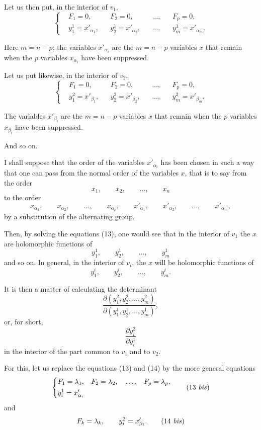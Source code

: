 \documentclass{article}
\begin{document}
Let us then put, in the interior of $v_{1}$,
\[
\left\{
\begin{aligned}
&F_{1} = 0, &&F_{2} = 0, &&\ldots, &&F_{p} = 0,\\
&y^{1}_{1} = x'_{\alpha_{1}}, &&y^{1}_{2} = x'_{\alpha_{2}}, &&\ldots, &&y^{1}_{m} = x'_{\alpha_{m}}.
\end{aligned}
\right.
\tag{13}
\]

Here $m = n - p$; the variables $x'_{\alpha_{i}}$ are the $m = n - p$ variables $x$ that remain when the $p$ variables $x_{\alpha_{i}}$ have been suppressed.

Let us put likewise, in the interior of $v_{2}$,
\[
\left\{
\begin{aligned}
&F_{1} = 0, &&F_{2} = 0, &&\ldots, &&F_{p} = 0,\\
&y^{2}_{1} = x'_{\beta_{1}}, &&y^{2}_{2} = x'_{\beta_{2}}, &&\ldots, &&y^{2}_{m} = x'_{\beta_{m}}.
\end{aligned}
\right.
\tag{14}
\]

The variables $x'_{\beta_{i}}$ are the $m = n - p$ variables $x$ that remain when the $p$ variables $x_{\beta_{i}}$ have been suppressed.

And so on.

I shall suppose that the order of the variables $x'_{\alpha_{i}}$ has been chosen in such a way that one can pass from the normal order of the variables $x$, that is to say from the order
\[
x_{1}, \qquad x_{2}, \qquad \ldots, \qquad x_{n}
\]
to the order
\[
x_{\alpha_{1}}, \qquad x_{\alpha_{2}}, \qquad \ldots, \qquad x_{\alpha_{p}}, \qquad x'_{\alpha_{1}}, \qquad x'_{\alpha_{2}}, \qquad \ldots, \qquad x'_{\alpha_{m}},
\]
by a substitution of the alternating group.

Then, by solving the equations (13), one would see that in the interior of $v_{1}$ the $x$ are holomorphic functions of
\[
y^{1}_{1}, \qquad y^{1}_{2}, \qquad \ldots, \qquad y^{1}_{m}
\]
and so on. In general, in the interior of $v_{i}$, the $x$ will be holomorphic functions of
\[
y^{i}_{1}, \qquad y^{i}_{2}, \qquad \ldots, \qquad y^{i}_{m}.
\]

It is then a matter of calculating the determinant
\[
\frac{\partial(y^{2}_{1}, y^{2}_{2}, \ldots, y^{2}_{m})}{\partial(y^{1}_{1}, y^{1}_{2}, \ldots, y^{1}_{m})},
\]
or, for short,
\[
\frac{\partial y^{2}_{i}}{\partial y^{1}_{i}}
\]
in the interior of the part common to $v_{1}$ and to $v_{2}$.

For this, let us replace the equations (13) and (14) by the more general equations
\[
\left\{
\begin{aligned}
&F_{1} = \lambda_{1}, &&F_{2} = \lambda_{2}, &&\ldots, &&F_{p} = \lambda_{p},\\
&y^{1}_{i} = x'_{\alpha_{i}}
\end{aligned}
\right.
\tag{13 \textit{bis}}
\]
and
\[
F_{k} = \lambda_{k}, \qquad y^{2}_{i} = x'_{\beta_{i}}.
\tag{14 \textit{bis}}
\]
\end{document}
